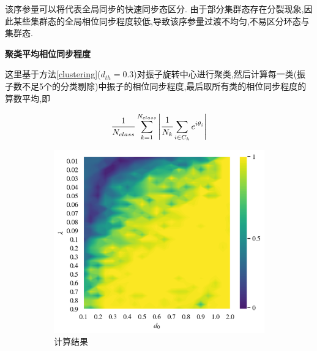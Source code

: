 \documentclass{article}
\begin{document}
\vspace{-0.5cm}
该序参量可以将代表全局同步的快速同步态区分. 由于部分集群态存在分裂现象,因此某些集群态的全局相位同步程度较低,导致该序参量过渡不均匀,不易区分环态与集群态. 

\newpage
\noindent\textbf{聚类平均相位同步程度}

这里基于方法\ref{clustering}($d_{th}=0.3$)对振子旋转中心进行聚类,然后计算每一类(振子数不足5个的分类剔除)中振子的相位同步程度,最后取所有类的相位同步程度的算数平均,即

$$\frac{1}{N_{class}}\sum_{k=1}^{N_{class}}\left|\cfrac{1}{N_{k}}\sum_{i\in C_{k}}e^{i\theta_i}\right|$$

\vspace{-0.5cm}
\begin{figure}[H]
	\centering
	\begin{subfigure}[b]{0.49\textwidth}
		\includegraphics[width=\textwidth]{./figs/clusteringPhaseSync.png}
		\vspace{-1cm}
		\caption{计算结果}
	\end{subfigure}
	\begin{subfigure}[b]{0.49\textwidth}

\end{subfigure}
\end{figure}
\end{document}
